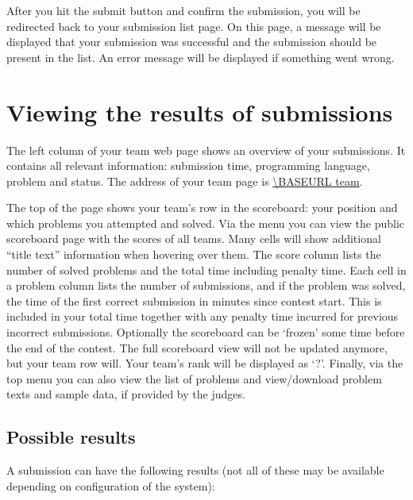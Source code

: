 After you hit the submit button and confirm the submission, you will
be redirected back to your submission list page. On this page, a message
will be displayed that your submission was successful and the
submission should be present in the list. An error message will be
displayed if something went wrong.

\section{Viewing the results of submissions}

The left column of your team web page shows an overview of your submissions.
It contains all relevant information: submission time, programming
language, problem and status. The address of your team page is
\url{\BASEURL team}.

The top of the page shows your team's row in the scoreboard: your position and
which problems you attempted and solved. Via the menu you can view the public
scoreboard page with the scores of all teams. Many cells will show
additional ``title text'' information when hovering over them. The
score column lists the number of solved problems and the total time including
penalty time. Each cell in a problem column lists the number of submissions,
and if the problem was solved, the time of the first correct
submission in minutes since contest start. This is included in your
total time together with any penalty time incurred for previous
incorrect submissions. Optionally the scoreboard can
be `frozen' some time before the end of the contest. The full scoreboard view
will not be updated anymore, but your team row will. Your team's rank will
be displayed as `?'. Finally, via the top menu you can also view the
list of problems and view/download problem texts and sample data, if
provided by the judges.

\subsection{Possible results}

A submission can have the following results (not all of these may be
available depending on configuration of the system):

